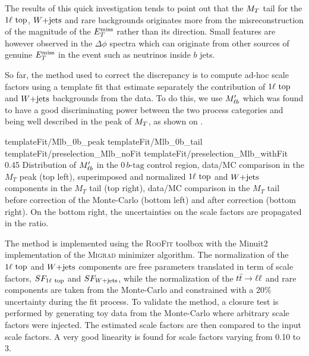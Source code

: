     The results of this quick investigation tends to point out that the $M_T$ tail for
    the $1\ell~\text{top}$, $\text{$W$+jets}$ and rare backgrounds originates more from the
    misreconstruction of the magnitude of the $E_T^\text{miss}$ rather than its direction. Small
    features are however observed in the $\Delta \phi$ spectra which can originate from
    other sources of genuine $E_T^\text{miss}$ in the event such as neutrinos inside $b$ jets.

    So far, the method used to correct the discrepancy is to compute ad-hoc scale factors
    using a template fit that estimate separately the contribution of $1\ell~\text{top}$ and
    $\text{$W$+jets}$ backgrounds from the data. To do this, we use $M'_{\ell b}$ which was found to have a good
    discriminating power between the two process categories and being well described in
    the peak of $M_T$, as shown on .

                      {templateFit/Mlb_0b_peak}
                      {templateFit/Mlb_0b_tail}
                      {templateFit/preselection_Mlb_noFit}
                      {templateFit/preselection_Mlb_withFit}
                      {0.45}
                      {Distribution of $M'_{\ell b}$ in the $0\, b\text{-tag}$ control region,
                      data/MC comparison in the $M_T$ peak (top left), superimposed and
                      normalized $1\ell~\text{top}$ and $\text{$W$+jets}$ components in the $M_T$ tail
                      (top right), data/MC comparison in the $M_T$ tail before correction
                      of the Monte-Carlo (bottom left) and after correction (bottom right).
                      On the bottom right, the uncertainties on the scale factors are
                      propagated in the ratio.}

    The method is implemented using the \textsc{RooFit} toolbox \cite{RooFit} with the Minuit2
    implementation of the \textsc{Migrad} minimizer algorithm. The normalization
    of the $1\ell~\text{top}$ and $\text{$W$+jets}$ components are free parameters translated in term
    of scale factors, $SF_{1\ell~\text{top}}$ and $SF_{\text{$W$+jets}}$, while the normalization of
    the $t\bar{t} \rightarrow \ell \ell$ and rare components are taken from the Monte-Carlo and constrained
    with a 20\% uncertainty during the fit process. To validate the method, a closure test
    is performed by generating toy data from the Monte-Carlo where arbitrary scale factors
    were injected. The estimated scale factors are then compared to the input scale factors.
    A very good linearity is found for scale factors varying from 0.10 to 3.

